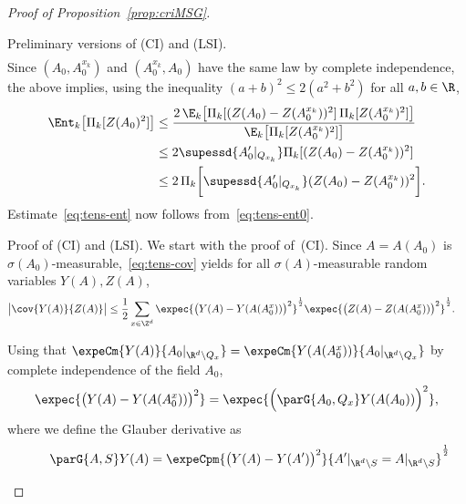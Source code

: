 \begin{proof}[Proof of Proposition~\ref{prop:criMSG}]
\begin{step}{Preliminary versions of (CI) and (LSI).}
\begin{align*}
\end{align*}
Since $(A_0,A_0^{x_k})$ and $(A_0^{x_k},A_0)$ have the same law by complete independence, the above implies, using the inequality $(a+b)^2\le2(a^2+b^2)$ for all $a,b\in\R$,
\begin{align*}
\Ent_{k}\big[\Pi_k[Z(A_0)^2]\big]&\le\frac{2\,\E_k\big[\Pi_k[(Z(A_0)-Z(A_0^{x_k}))^2]\,\Pi_k[Z(A_0^{x_k})^2]\big]}{\E_k\big[\Pi_k[Z(A_0^{x_k})^2]\big]}\\
&\le2\supessd{A_0'|_{Q_{x_k}}}\Pi_k[(Z(A_0)-Z(A_0^{x_k}))^2]\\
&\le2\,\Pi_k\bigg[\supessd{A_0'|_{Q_{x_k}}}(Z(A_0)-Z(A_0^{x_k}))^2\bigg].
\end{align*}
Estimate~\eqref{eq:tens-ent} now follows from~\eqref{eq:tens-ent0}.
\end{step}

\begin{step}{Proof of (CI) and (LSI).}\label{step3proofprop2.3}
We start with the proof of~(CI). Since \linebreak$A=A(A_0)$ is $\sigma(A_0)$-measurable,~\eqref{eq:tens-cov} yields for all $\sigma(A)$-measurable random variables $Y(A),Z(A)$,
\begin{align*}
\big|\cov{Y(A)}{Z(A)}\big|&\le\frac12\sum_{x\in\Z^d}\expec{\big(Y(A)-Y(A(A_0^{x}))\big)^2}^\frac12\expec{\big(Z(A)-Z(A(A_0^{x}))\big)^2}^\frac12.
\end{align*}
\goodbreak

Using that $\expeCm{Y(A)}{A_0|_{\R^d\setminus Q_x}}=\expeCm{Y(A(A_0^x))}{A_0|_{\R^d\setminus Q_x}}$ by complete independence of the field $A_0$,
\[
\expec{\big(Y(A)-Y(A(A_0^{x}))\big)^2}=\expec{\Big(\parG{A_0,Q_x}Y(A(A_0))\Big)^2},
\]
where we define the Glauber derivative as
\begin{align*}
\qquad\parG{A,S}Y(A)=\expeCpm{\big(Y(A)-Y(A')\big)^2}{A'|_{\R^d\setminus S}=A|_{\R^d\setminus S}}^\frac12
\end{align*}


\end{step}
\end{proof}

